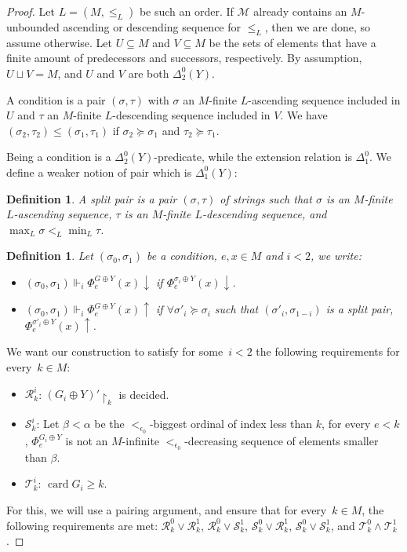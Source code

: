 \documentclass{article}
\numberwithin{theorem}{section}
\newtheorem{definition}[theorem]{Definition}
\newcommand{\R}{\mathcal{R}}
\renewcommand{\S}{\mathcal{S}}
\newcommand{\T}{\mathcal{T}}
\newcommand{\M}{\mathcal{M}}
\newcommand{\uh}[0]{{\upharpoonright}}
\newcommand{\card}{\operatorname{card}}
\begin{document}
\begin{proof}
Let $L = (M, \leq_L)$ be such an order. If $\M$ already contains an $M$-unbounded ascending or descending sequence for $\leq_L$, then we are done, so assume otherwise. Let $U \subseteq M$ and $V \subseteq M$ be the sets of elements that have a finite amount of predecessors and successors, respectively. By assumption, $U \sqcup V = M$, and $U$ and $V$ are both $\Delta^0_2(Y)$.

A condition is a pair $(\sigma, \tau)$ with $\sigma$ an $M$-finite $L$-ascending sequence included in $U$ and $\tau$ an $M$-finite $L$-descending sequence included in $V$. We have $(\sigma_2, \tau_2) \leq (\sigma_1, \tau_1)$ if $\sigma_2 \succeq \sigma_1$ and $\tau_2 \succeq \tau_1$.

Being a condition is a $\Delta_2^0(Y)$-predicate, while the extension relation is $\Delta_1^0$. We define a weaker notion of pair which is $\Delta^0_1(Y)$:
\begin{definition}
A \emph{split pair} is a pair $(\sigma, \tau)$ of strings such that $\sigma$ is an $M$-finite $L$-ascending sequence, $\tau$ is an $M$-finite $L$-descending sequence, and $\max_L \sigma <_L \min_L \tau$.
\end{definition}

\begin{definition}
Let $(\sigma_0, \sigma_1)$ be a condition, $e, x \in M$ and $i < 2$, we write:
\begin{itemize}
    \item $(\sigma_0, \sigma_1) \Vdash_i \Phi_e^{G \oplus Y}(x) \downarrow$ if $\Phi_e^{\sigma_i \oplus Y}(x) \downarrow$. 
    \item $(\sigma_0, \sigma_1) \Vdash_i \Phi_e^{G \oplus Y}(x) \uparrow$ if $\forall \sigma'_i \succeq \sigma_i$ such that $(\sigma'_i, \sigma_{1-i})$ is a split pair, $\Phi_e^{\sigma'_i \oplus Y}(x)\uparrow$.
\end{itemize}   
\end{definition}

We want our construction to satisfy for some~$i < 2$ the following requirements for every~$k \in M$:
\begin{itemize}
    \item $\mathcal{R}^i_k$: $(G_i \oplus Y)' \uh_k$ is decided.
    \item $\mathcal{S}^i_{k}$: Let $\beta < \alpha$ be the $<_{\epsilon_0}$-biggest ordinal of index less than $k$, for every $e < k$, $\Phi_e^{G_i \oplus Y}$ is not an $M$-infinite $<_{\epsilon_0}$-decreasing sequence of elements smaller than $\beta$.
    \item $\mathcal{T}^i_k$: $\card G_i \geq k$.
\end{itemize}
For this, we will use a pairing argument, and ensure that for every~$k \in M$, the following requirements are met: $\R^0_k \vee \R^1_k$, $\R^0_k \vee \S^1_k$, $\S^0_k \vee \R^1_k$, $\S^0_k \vee \S^1_k$, and $\T^0_k \wedge \T^1_k$.


\end{proof}
\end{document}

